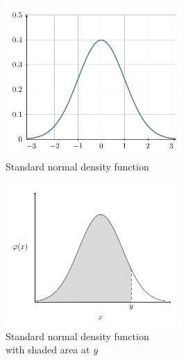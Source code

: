 \documentclass[a4paper]{article}
\begin{document}
		\begin{multicols}{2}
		\centering
		\includegraphics[width=0.5\textwidth]{normal_standard}\\
		Standard normal density function

		\columnbreak		
		
		\includegraphics[width=0.5\textwidth]{normal_standard_gray}\\
		Standard normal density function\\ with shaded area at $y$
		
		\end{multicols}
\end{document}
